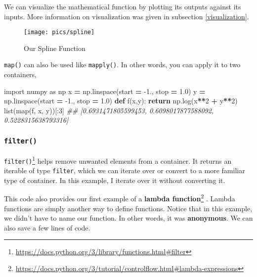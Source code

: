 \documentclass[12pt,krantz2]{krantz}
\makeatletter
\newenvironment{Shaded}{\begin{snugshade}}{\end{snugshade}}
\newcommand{\BuiltInTok}[1]{#1}
\newcommand{\CommentTok}[1]{\textcolor[rgb]{0.37,0.37,0.37}{\textit{#1}}}
\newcommand{\ControlFlowTok}[1]{\textcolor[rgb]{0.27,0.27,0.27}{\textbf{#1}}}
\newcommand{\DecValTok}[1]{\textcolor[rgb]{0.06,0.06,0.06}{#1}}
\newcommand{\FloatTok}[1]{\textcolor[rgb]{0.06,0.06,0.06}{#1}}
\newcommand{\ImportTok}[1]{#1}
\newcommand{\KeywordTok}[1]{\textcolor[rgb]{0.27,0.27,0.27}{\textbf{#1}}}
\newcommand{\NormalTok}[1]{#1}
\newcommand{\OperatorTok}[1]{\textcolor[rgb]{0.43,0.43,0.43}{\textbf{#1}}}
\renewcommand{\href}[2]{#2\footnote{\url{#1}}}
\newenvironment{kframe}{%
\medskip{}
\setlength{\fboxsep}{.8em}
 \def\at@end@of@kframe{}%
 \ifinner\ifhmode%
  \def\at@end@of@kframe{\end{minipage}}%
  \begin{minipage}{\columnwidth}%
 \fi\fi%
 \def\FrameCommand##1{\hskip\@totalleftmargin \hskip-\fboxsep
 \colorbox{shadecolor}{##1}\hskip-\fboxsep
     \hskip-\linewidth \hskip-\@totalleftmargin \hskip\columnwidth}%
 \MakeFramed {\advance\hsize-\width
   \@totalleftmargin\z@ \linewidth\hsize
   \@setminipage}}%
 {\par\unskip\endMakeFramed%
 \at@end@of@kframe}
\renewenvironment{Shaded}{\begin{kframe}}{\end{kframe}}
\makeatother
\begin{document}
We can visualize the mathematical function by plotting its outputs against its inputs. More information on visualization was given in subsection \ref{visualization}.

\begin{figure}

{\centering \texttt{[image: pics/spline]} 

}

\caption{Our Spline Function}\label{fig:unnamed-chunk-277}
\end{figure}

\texttt{map()} can also be used like \texttt{mapply()}. In other words, you can apply it to two containers,

\begin{Shaded}
\begin{Highlighting}[]
\ImportTok{import}\NormalTok{ numpy }\ImportTok{as}\NormalTok{ np}
\NormalTok{x }\OperatorTok{=}\NormalTok{ np.linspace(start }\OperatorTok{=} \FloatTok{-1.}\NormalTok{, stop }\OperatorTok{=} \FloatTok{1.0}\NormalTok{)}
\NormalTok{y }\OperatorTok{=}\NormalTok{ np.linspace(start }\OperatorTok{=} \FloatTok{-1.}\NormalTok{, stop }\OperatorTok{=} \FloatTok{1.0}\NormalTok{)}
\KeywordTok{def}\NormalTok{ f(x,y):}
    \ControlFlowTok{return}\NormalTok{ np.log(x}\OperatorTok{**}\DecValTok{2} \OperatorTok{+}\NormalTok{ y}\OperatorTok{**}\DecValTok{2}\NormalTok{)}
\BuiltInTok{list}\NormalTok{(}\BuiltInTok{map}\NormalTok{(f, x, y))[:}\DecValTok{3}\NormalTok{]}
\CommentTok{## [0.6931471805599453, 0.6098017877588092, 0.5228315638793316]}
\end{Highlighting}
\end{Shaded}

\hypertarget{filter}{%
\subsubsection{\texorpdfstring{\texttt{filter()}}{filter()}}\label{filter}}

\href{https://docs.python.org/3/library/functions.html\#filter}{\texttt{filter()}} helps remove unwanted elements from a container. It returns an iterable of type \texttt{filter}, which we can iterate over or convert to a more familiar type of container. In this example, I iterate over it without converting it.

This code also provides our first example of a \href{https://docs.python.org/3/tutorial/controlflow.html\#lambda-expressions}{\textbf{lambda function}} \citep{Lutz13}. Lambda functions are simply another way to define functions. Notice that in this example, we didn't have to name our function. In other words, it was \textbf{anonymous}. We can also save a few lines of code.
\end{document}
